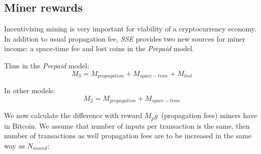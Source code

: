 \documentclass[]{article}   %
\newcommand{\esse}{\textit{SSE}}
\newcommand{\ignore}[1]{} %
\begin{document}
\ignore{
  and share of coins moved in a block:

  \begin{equation}
    M_{flow} \approx { N_{transactions} \cdot V_{output} \over N_{coins}} = {K \cdot B \over f_p}
  \end{equation}

  Thus, money flow may be controlled with \textit{K} parameter. This formula provide a way to estimate \textit{K} based on current Bitcoin statistics:

  \begin{equation}
    K={M_{flow} \cdot f_p \over B} \approx {10^{-9}} ({BTC / (Byte \cdot Block)})
  \end{equation}

  For a mean output size of 36 Bytes space-time fee part will exceed propagation fee after 5555 blocks or 38 days. 

  From money flow analysis we can find out how to use \esse{} model to control cryptocurrency money flow, changing space-time price and encourage active economy participants. Another money flow analysis result is the dependency between $L$ and $K$ \ref{eq:ltmean} that can particularly by used in the \textit{Demurrage balance} model to reduce number of model parameters.
}




\subsection{Miner rewards}
\label{minerrew}
Incentivizing mining is very important for viability of a cryptocurrency economy. 
In addition to usual propagation fee, \esse{} provides two new sources for miner income: a space-time fee and lost coins in the \textit{Prepaid} model.

Thus in the \textit{Prepaid} model:
\begin{equation}
M_{3} = M_{propagation} + M_{space-time} + M_{lost}
\end{equation}

In other models:
\begin{equation}
M_{2} = M_{propagation} + M_{space-time}
\end{equation}

We now calculate the difference with reward $M_pg$~(propagation fees) miners have in Bitcoin. We assume that number of inputs per transaction is the same, then number of transactions as well propagation fees are to be increased in the same way as $N_{moved}$:
\end{document}
